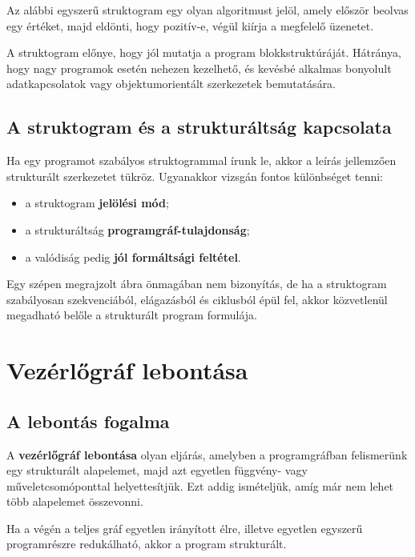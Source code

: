 Az alábbi egyszerű struktogram egy olyan algoritmust jelöl, amely először beolvas egy értéket, majd eldönti, hogy pozitív-e, végül kiírja a megfelelő üzenetet.



A struktogram előnye, hogy jól mutatja a program blokkstruktúráját. Hátránya, hogy nagy programok esetén nehezen kezelhető, és kevésbé alkalmas bonyolult adatkapcsolatok vagy objektumorientált szerkezetek bemutatására.

\subsection{A struktogram és a strukturáltság kapcsolata}

Ha egy programot szabályos struktogrammal írunk le, akkor a leírás jellemzően strukturált szerkezetet tükröz. Ugyanakkor vizsgán fontos különbséget tenni:

\begin{itemize}
  \item a struktogram \textbf{jelölési mód};
  \item a strukturáltság \textbf{programgráf-tulajdonság};
  \item a valódiság pedig \textbf{jól formáltsági feltétel}.
\end{itemize}

Egy szépen megrajzolt ábra önmagában nem bizonyítás, de ha a struktogram szabályosan szekvenciából, elágazásból és ciklusból épül fel, akkor közvetlenül megadható belőle a strukturált program formulája.

\section{Vezérlőgráf lebontása}

\subsection{A lebontás fogalma}

A \textbf{vezérlőgráf lebontása} olyan eljárás, amelyben a programgráfban felismerünk egy strukturált alapelemet, majd azt egyetlen függvény- vagy műveletcsomóponttal helyettesítjük. Ezt addig ismételjük, amíg már nem lehet több alapelemet összevonni.

Ha a végén a teljes gráf egyetlen irányított élre, illetve egyetlen egyszerű programrészre redukálható, akkor a program strukturált.

